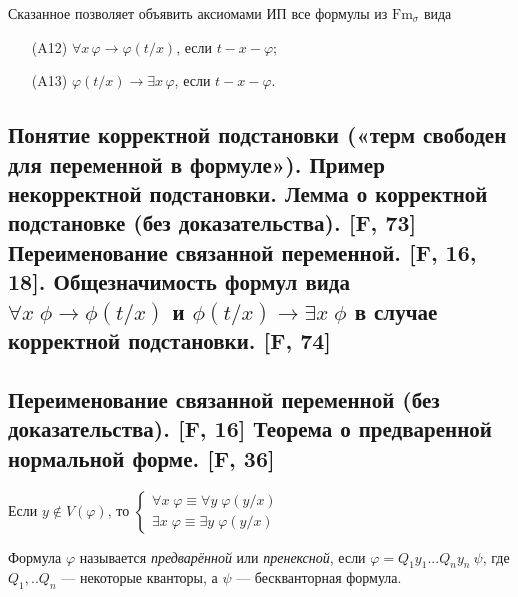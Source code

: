 \documentclass[a4paper, fleqn]{article}
\begin{document}
    Сказанное позволяет объявить аксиомами ИП все формулы из $\text{Fm}_{\sigma}$ вида\\[-25 pt]
    \begin{enumerate}
    \item[(A12)] $\forall x\, \varphi \to \varphi(t/x)$, если $t-x-\varphi$;
    \item[(A13)] $\varphi(t/x) \to \exists x\, \varphi$, если $t-x-\varphi$.
    \end{enumerate}

    \subsection{Понятие корректной подстановки («терм свободен для переменной в формуле»). Пример некорректной подстановки. Лемма о корректной подстановке (без доказательства). [F, 73] Переименование связанной переменной. [F, 16, 18]. Общезначимость формул вида $\forall x \; \phi \to \phi(t/x)$ и $\phi(t/x) \to \exists x \; \phi$ в случае корректной подстановки. [F, 74]}

    \subsection{Переименование связанной переменной (без доказательства). [F, 16] Теорема о предваренной нормальной форме. [F, 36]}
    \begin{proposition}

        Если $y \notin V(\varphi)$, то $\begin{cases}
        \forall x \; \varphi \equiv \forall y \; \varphi(y/x) \\
        \exists x \; \varphi \equiv \exists y \; \varphi(y/x)
        \end{cases}$
    \end{proposition}

    \begin{definition}
        Формула $\varphi$ называется \textit{предварённой} или \textit{пренексной}, если $\varphi = Q_1y_1...Q_ny_n \: \psi$, где $Q_1,..Q_n$ --- некоторые кванторы, а $\psi$ --- бескванторная формула.
    \end{definition}
\end{document}
